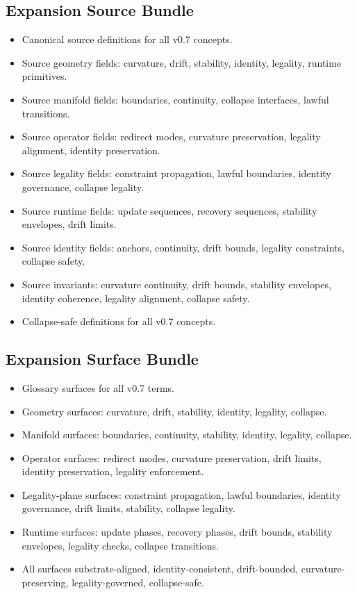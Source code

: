 \subsection{Expansion Source Bundle}
\begin{itemize}
    \item Canonical source definitions for all v0.7 concepts.
    \item Source geometry fields: curvature, drift, stability, identity, legality, runtime primitives.
    \item Source manifold fields: boundaries, continuity, collapse interfaces, lawful transitions.
    \item Source operator fields: redirect modes, curvature preservation, legality alignment, identity preservation.
    \item Source legality fields: constraint propagation, lawful boundaries, identity governance, collapse legality.
    \item Source runtime fields: update sequences, recovery sequences, stability envelopes, drift limits.
    \item Source identity fields: anchors, continuity, drift bounds, legality constraints, collapse safety.
    \item Source invariants: curvature continuity, drift bounds, stability envelopes, identity coherence, legality alignment, collapse safety.
    \item Collapse-safe definitions for all v0.7 concepts.
\end{itemize}

\subsection{Expansion Surface Bundle}
\begin{itemize}
    \item Glossary surfaces for all v0.7 terms.
    \item Geometry surfaces: curvature, drift, stability, identity, legality, collapse.
    \item Manifold surfaces: boundaries, continuity, stability, identity, legality, collapse.
    \item Operator surfaces: redirect modes, curvature preservation, drift limits, identity preservation, legality enforcement.
    \item Legality-plane surfaces: constraint propagation, lawful boundaries, identity governance, drift limits, stability, collapse legality.
    \item Runtime surfaces: update phases, recovery phases, drift bounds, stability envelopes, legality checks, collapse transitions.
    \item All surfaces substrate-aligned, identity-consistent, drift-bounded, curvature-preserving, legality-governed, collapse-safe.
\end{itemize}


